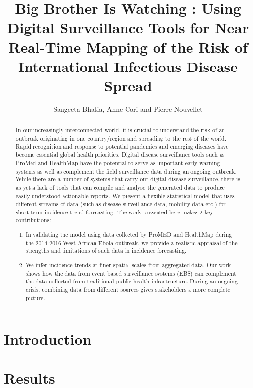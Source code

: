 \documentclass[a4paper,12pt]{article}
\begin{document}
\title{Big Brother Is Watching : Using Digital Surveillance Tools for Near Real-Time Mapping of the Risk of International Infectious Disease Spread}
\author{ Sangeeta Bhatia, Anne Cori and Pierre Nouvellet}
\maketitle

\begin{abstract}
  In our increasingly interconnected world, it is crucial to
  understand the risk of an outbreak originating in one country/region
  and  spreading to the rest of the world. Rapid recognition and
  response to potential pandemics and emerging diseases have become
  essential global health priorities. Digital disease surveillance
  tools such as ProMed and HealthMap have the potential to serve as
  important early warning systems as well as complement the field
  surveillance data during an ongoing outbreak. While there are a
  number of systems that carry out digital disease surveillance, there
  is as yet a lack of tools that can compile and analyse the generated
  data to produce easily understood actionable reports. We present a flexible statistical model that uses different streams
  of data (such as disease surveillance data, mobility data etc.) for
  short-term incidence trend forecasting.
  The work presented here makes 2 key contributions:
  \begin{enumerate}
  \item In validating the model using data collected by ProMED and
    HealthMap during the 2014-2016 West African Ebola outbreak,
    we provide a realistic appraisal of the strengths and limitations
    of such data in incidence forecasting.
    \item We infer incidence trends at finer spatial scales from
      aggregated data. Our work shows how the data from
      event based surveillance systems (EBS) can complement the data
      collected from traditional
      public health infrastructure. During an
      ongoing crisis, combining data from different sources gives
      stakeholders a more complete picture.
  \end{enumerate}
\end{abstract}
\section{Introduction}
\section{Results}
\end{document}
